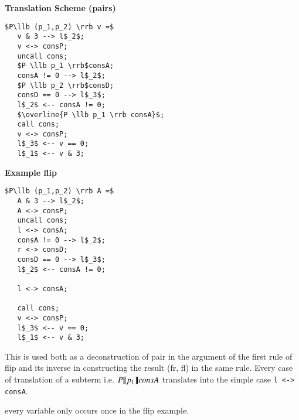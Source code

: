 \documentclass[a4paper]{article}
\begin{document}
\begin{minipage}[t]{0.6\textwidth}
\textbf{Translation Scheme (pairs)}
\begin{lstlisting}
$P\llb (p_1,p_2) \rrb v =$
   v & 3 --> l$_2$;
   v <-> consP;
   uncall cons;
   $P \llb p_1 \rrb$consA;
   consA != 0 --> l$_2$;
   $P \llb p_2 \rrb$consD;
   consD == 0 --> l$_3$;
   l$_2$ <-- consA != 0;
   $\overline{P \llb p_1 \rrb consA}$;
   call cons;
   v <-> consP;
   l$_3$ <-- v == 0;
   l$_1$ <-- v & 3;
\end{lstlisting}
\end{minipage}
\qquad
\begin{minipage}[t]{0.4\textwidth}
\textbf{Example flip}
\begin{lstlisting}
$P\llb (p_1,p_2) \rrb A =$
   A & 3 --> l$_2$;
   A <-> consP;
   uncall cons;
   l <-> consA;
   consA != 0 --> l$_2$;
   r <-> consD;
   consD == 0 --> l$_3$;
   l$_2$ <-- consA != 0;

   l <-> consA;

   call cons;
   v <-> consP;
   l$_3$ <-- v == 0;
   l$_1$ <-- v & 3;
\end{lstlisting}
This is used both as a deconstruction of pair in the argument of the first rule of flip and its inverse in constructing the result (fr, fl) in the same rule. Every case of translation of a subterm i.e. \(P \llbracket p_1 \rrbracket consA\) translates into the simple case \texttt{l <-> consA}.

every variable only occurs once in the flip example.
\end{minipage}
\end{document}
